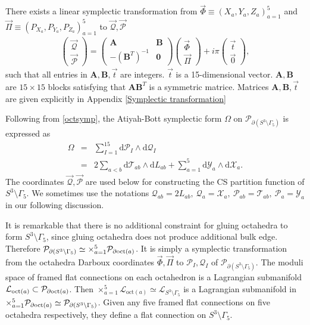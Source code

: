 \documentclass[aps,prd,notitlepage,nofootinbib,superscriptaddress,groupedaddress,twocolumn]{revtex4-1}
\def\be{\begin{eqnarray}}
\def\ee{\end{eqnarray}}
\newcommand{\cl}{\mathcal L}
\newcommand{\calp}{\mathcal P}
\newcommand{\ct}{\mathcal T}
\newcommand{\cx}{\mathcal X}
\newcommand{\cy}{\mathcal Y}
\newcommand{\scrp}{\mathscr{P}}
\newcommand{\scrq}{\mathscr{Q}}
\newcommand{\G}{\Gamma}
\renewcommand{\O}{\Omega}
\newcommand{\rmd}{\mathrm d}
\begin{document}
There exists a linear symplectic transformation from $\vec{\Phi} \equiv (X_{a}, Y_{a}, Z_{a} )_{a=1}^{5}$ and $\vec{\Pi} \equiv (P_{X_{a}}, P_{Y_{a}}, P_{Z_{a}} )_{a=1}^{5}$ to $\vec{\mathscr Q},\vec{\mathscr P}$
\be
\left(\begin{array}{c}
\vec{\mathscr Q} \\
\vec{\mathscr P}
\end{array}\right)=\left(\begin{array}{ll}
\mathbf{A} & \mathbf{B} \\
-(\mathbf{B}^{T})^{-1} & \mathbf{0}
\end{array}\right)\left(\begin{array}{l}
\vec{\Phi} \\
\vec{\Pi}
\end{array}\right)+i \pi\left(\begin{array}{l}
\vec{t} \\
\vec{0}
\end{array}\right),\label{ABCDt}
\ee
such that all entries in $\mathbf{A}, \mathbf{B},\vec{t}$ are integers. $\vec{t}$ is a 15-dimensional vector. $\mathbf{A}, \mathbf{B}$ are $15\times 15$ blocks satisfying that $\mathbf{A} \mathbf{B}^T$ is a symmetric matrice. Matrices $\mathbf{A}, \mathbf{B}, \vec{t}$ are given explicitly in Appendix \ref{Symplectic transformation}
   
Following from \eqref{octsymp}, the Atiyah-Bott symplectic form $\O$ on $\calp_{\partial(S^3\setminus\G_5)}$ is expressed as
\be
\O&=&\sum_{I=1}^{15}\rmd \mathscr{P}_I\wedge \rmd \mathscr{Q}_I\nonumber\\
&=&2\sum_{a<b}\rmd \ct_{ab}\wedge \rmd L_{ab}+\sum_{a=1}^{5}\rmd \cy_a\wedge \rmd \cx_a.\label{Odarboux3fold}
\ee
The coordinates $\vec{\scrq},\vec{\scrp}$ are used below for constructing the CS partition function of $S^3\setminus \G_5$. We sometimes use the notations $\scrq_{ab}=2L_{ab},\ \scrq_a=\cx_a,\ \scrp_{ab}=\ct_{ab},\ \scrp_a=\cy_a$ in our following discussion.


It is remarkable that there is no additional constraint for gluing octahedra to form $S^3\setminus\G_5$, since gluing octahedra does not produce additional bulk edge. Therefore $\calp_{\partial(S^3\setminus\G_5)}\simeq\times_{a=1}^5\calp_{\partial {\rm oct}(a)}$. It is simply a symplectic transformation from the octahedra Darboux coordinates $\vec{\Phi},\vec{\Pi}$ to $\mathscr{P}_I, \mathscr{Q}_I$ of $\calp_{\partial(S^3\setminus\G_5)}$. The moduli space of framed flat connections on each octahedron is a Lagrangian submanifold $\cl_{\mathrm{oct}(a)}\subset\calp_{\partial {\rm oct}(a)}$. Then $\times_{a=1}^5\cl_{\mathrm{oct}(a)}\simeq \cl_{S^3\setminus \G_5}$ is a Lagrangian submanifold in $\times_{a=1}^5\calp_{\partial {\rm oct}(a)}\simeq \calp_{\partial(S^3\setminus\G_5)}$. Given any five framed flat connections on five octahedra respectively, they define a flat connection on $S^3\setminus\G_5$.
\end{document}
